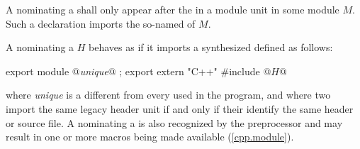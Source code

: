 \begin{std.txt}
  \begin{after}\color{addclr}
  \alinea
  A  nominating
  a  shall only appear after
  the  in a module unit in
  some module $M$.
  Such a declaration imports the so-named
   of $M$.

  \color{addclr}
  \alinea
  A  nominating
  a  $H$ behaves as if it imports
  a synthesized  defined as follows:

  \begin{codeblock}\color{addclr}
  export module @\textit{unique}@ ;
  export extern "C++" {
  #include @$H$@
  }
  \end{codeblock}

  where \textit{unique} is a 
  different from every 
  used in the program, and where two
  import the same legacy header unit if and only if
  their  identify the same
  header or source file.
  \enternote
  A  nominating
  a  is also recognized by the
  preprocessor and may result in one or more macros being
  made available (\ref{cpp.module}).
  \exitnote
  \end{after}


\end{std.txt}
